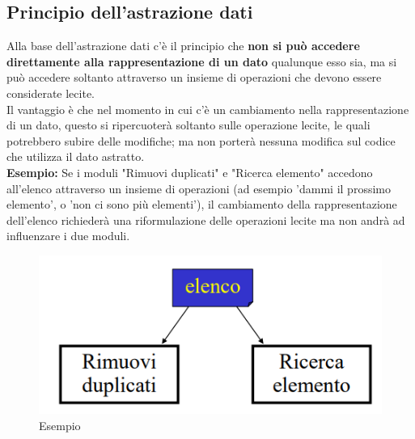 \documentclass{article}
\begin{document}
	\subsection{Principio dell'astrazione dati}
	Alla base dell'astrazione dati c'è il principio che \textbf{non si può accedere direttamente alla rappresentazione di un dato} qualunque esso sia, ma si può accedere soltanto attraverso un insieme di operazioni che devono essere considerate lecite. \\
	Il vantaggio è che nel momento in cui c'è un cambiamento nella rappresentazione di un dato, questo si ripercuoterà soltanto sulle operazione lecite, le quali potrebbero subire delle modifiche; ma non porterà nessuna modifica sul codice che utilizza il dato astratto. 
	\vspace{\baselineskip} \\
	\textbf{Esempio:} Se i moduli "Rimuovi duplicati" e "Ricerca elemento" accedono all'elenco attraverso un insieme di operazioni (ad esempio 'dammi il prossimo elemento', o 'non ci sono più elementi'), il cambiamento della rappresentazione dell'elenco richiederà una riformulazione delle operazioni lecite ma non andrà ad influenzare i due moduli. 
	\begin{figure}[h] %
		\centering
		\includegraphics[width=0.5\linewidth]{assets/immagine1} 
		\caption{Esempio}
		\label{fig:etichetta}
	\end{figure}
	
\end{document}
